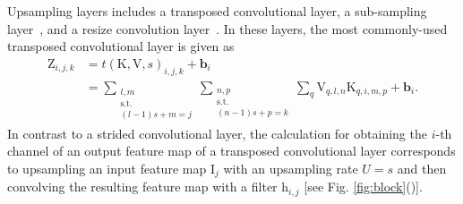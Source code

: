\documentclass{article}
\newcommand{\myvector}[1]{\boldsymbol{#1}}
\newcommand{\mymatrix}[1]{\mathrm{#1}}
\newcommand{\mytensor}[1]{\boldsymbol{\mathrm{#1}}}
\newcounter{num}
\begin{document}
  Upsampling layers includes a transposed convolutional layer,
  a sub-sampling layer~\cite{shi2016real},
  and a resize convolution layer~\cite{odena2016deconvolution}.
  In these layers,
  the most commonly-used transposed convolutional layer is given as
  \begin{align}
    \mytensor{Z}_{i, j, k} &= t(\mytensor{K}, \mytensor{V}, s)_{i, j, k}
                            + \myvector{b}_i \nonumber \\
                           &= \sum_{\substack{l, m \\ \mathrm{s.t.} \\ (l-1)s+m=j}}
                              \sum_{\substack{n, p \\ \mathrm{s.t.} \\ (n-1)s+p=k}}
                              \sum_q \mytensor{V}_{q, l, n}
                                     \mytensor{K}_{q, i, m, p}
                            + \myvector{b}_i.
    \label{eq:trans_conv_layer}
  \end{align}
  In contrast to a strided convolutional layer,
  the calculation for obtaining the $i$-th channel of an output feature map
  of a transposed convolutional layer corresponds to
  upsampling an input feature map $\mymatrix{I}_j$ with an upsampling rate $U=s$
  and then convolving the resulting feature map with a filter $\mymatrix{h}_{i, j}$
  [see Fig. \ref{fig:block}()].
\end{document}
